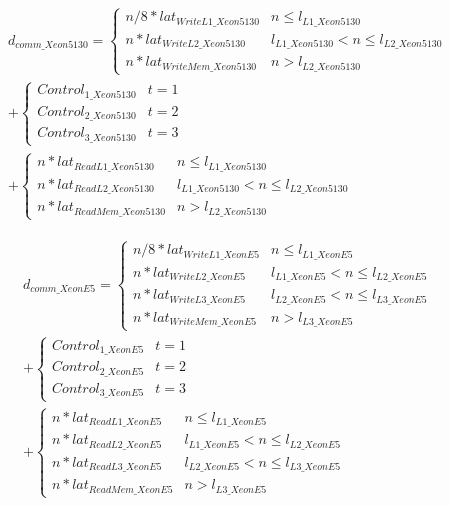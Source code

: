\begin{equation}\label{eq:discussion1}
\begin{split}
d_{comm\_Xeon5130} = \begin{cases} n/8 * lat_{WriteL1\_Xeon5130} & n \leq l_{L1\_Xeon5130}\\n * lat_{WriteL2\_Xeon5130} & l_{L1\_Xeon5130} < n \leq l_{L2\_Xeon5130}\\n * lat_{WriteMem\_Xeon5130} & n > l_{L2\_Xeon5130}\end{cases} \\ + \begin{cases}Control_{1\_Xeon5130} & t = 1\\Control_{2\_Xeon5130} & t = 2\\Control_{3\_Xeon5130} & t = 3\end{cases} \\ + \begin{cases}n * lat_{ReadL1\_Xeon5130} & n \leq l_{L1\_Xeon5130}\\n * lat_{ReadL2\_Xeon5130} & l_{L1\_Xeon5130} < n \leq l_{L2\_Xeon5130}\\n * lat_{ReadMem\_Xeon5130} & n > l_{L2\_Xeon5130}\end{cases}
\end{split}
\end{equation}

\begin{equation}\label{eq:discussion2}
\begin{split}
d_{comm\_XeonE5} = \begin{cases} n/8 * lat_{WriteL1\_XeonE5} & n \leq l_{L1\_XeonE5}\\n * lat_{WriteL2\_XeonE5} & l_{L1\_XeonE5} < n \leq l_{L2\_XeonE5}\\n * lat_{WriteL3\_XeonE5} & l_{L2\_XeonE5} < n \leq l_{L3\_XeonE5}\\n * lat_{WriteMem\_XeonE5} & n > l_{L3\_XeonE5}\end{cases} \\ + \begin{cases}Control_{1\_XeonE5} & t = 1\\Control_{2\_XeonE5} & t = 2\\Control_{3\_XeonE5} & t = 3\end{cases} \\ + \begin{cases}n * lat_{ReadL1\_XeonE5} & n \leq l_{L1\_XeonE5}\\n * lat_{ReadL2\_XeonE5} & l_{L1\_XeonE5} < n \leq l_{L2\_XeonE5}\\n * lat_{ReadL3\_XeonE5} & l_{L2\_XeonE5} < n \leq l_{L3\_XeonE5}\\n * lat_{ReadMem\_XeonE5} & n > l_{L3\_XeonE5}\end{cases}
\end{split}
\end{equation}

